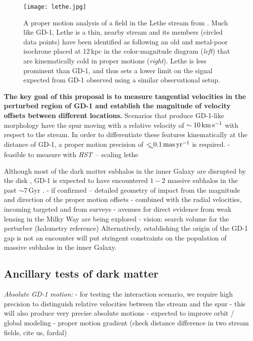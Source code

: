 \documentclass[12pt]{article}
\newcommand{\hst}{\textsl{HST}}
\begin{document}
\begin{figure}
\begin{center}
\texttt{[image: lethe.jpg]}
\end{center}
\caption{
A proper motion analysis of a field in the Lethe stream from \textcite{sohn2016}.
Much like GD-1, Lethe is a thin, nearby stream and its members (circled data points) have been identified as following an old and metal-poor isochrone placed at 12\,kpc in the color-magnitude diagram (\emph{left}) that are kinematically cold in proper motions (\emph{right}).
Lethe is less prominent than GD-1, and thus sets a lower limit on the signal expected from GD-1 observed using a similar observational setup.
}
\label{fig:lethe}
\end{figure}

{\bf The key goal of this proposal is to measure tangential velocities in the perturbed region of GD-1 and establish the magnitude of velocity offsets between different locations.}
Scenarios that produce GD-1-like morphology have the spur moving with a relative velocity of $\sim10\,\rm km\,s^{-1}$ with respect to the stream.
In order to differentiate these features kinematically at the distance of GD-1, a proper motion precision of $\lesssim0.1\,\rm mas\,yr^{-1}$ is required.
- feasible to measure with \hst\ -- scaling lethe

Although most of the dark matter subhalos in the inner Galaxy are disrupted by the disk \parencite{gk2017}, GD-1 is expected to have encountered $1-2$ massive subhalos in the past $\sim7$\,Gyr \parencite{erkal2016}.
- if confirmed -- detailed geometry of impact from the magnitude and direction of the proper motion offsets
- combined with the radial velocities, incoming targeted and from surveys
- avenues for direct evidence from weak lensing in the Milky Way are being explored \parencite{vtilburg2018}
- vision: search volume for the perturber (halometry reference)
Alternatively, establishing the origin of the GD-1 gap is not an encounter will put stringent constraints on the population of massive subhalos in the inner Galaxy.

\subsection*{Ancillary tests of dark matter}
\emph{Absolute GD-1 motion:}
- for testing the interaction scenario, we require high precision to distinguish relative velocities between the stream and the spur
- this will also produce very precise absolute motions
- expected to improve orbit / global modeling
- proper motion gradient (check distance difference in two stream fields, cite us, fardal)
\end{document}
